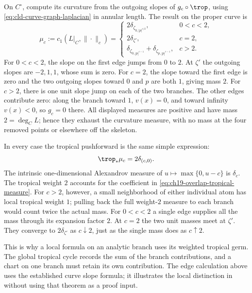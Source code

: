 \begin{example}
On $C^\circ$, compute its curvature from the outgoing slopes of
$g_c\circ\trop$, using \eqref{eq:cld-curve-graph-laplacian} in
annular length.  The result on the proper curve is
\begin{equation}
\label{eq:ch19-overlap-curve-measure}
 \mu_c:=c_1(L|_C,\|\cdot\|_c)=
 \begin{cases}
  2\delta_{\zeta_{0,|p|^{c/2}}},&0<c<2,\\
  2\delta_{\zeta'},&c=2,\\
  \delta_{\zeta_{0,|p|^{c-1}}}
   +\delta_{\zeta_{p,|p|^{c-1}}},&c>2.
 \end{cases}
\end{equation}
For $0<c<2$, the slope on the first edge jumps from $0$ to $2$.
At $\zeta'$ the outgoing slopes are $-2,1,1$, whose sum is zero.
For $c=2$, the slope toward the first edge is zero and the two
outgoing slopes toward $0$ and $p$ are both $1$, giving mass $2$.
For $c>2$, there is one unit slope jump on each of the two branches.
The other edges contribute zero: along the branch toward $1$, $v(x)=0$,
and toward infinity $v(x)<0$, so $g_c=0$ there.  All displayed
measures are positive and have mass $2=\deg_C L$; hence they exhaust
the curvature measure, with no mass at the four removed points or
elsewhere off the skeleton.

In every case the tropical pushforward is the same simple expression:
\begin{equation}
\label{eq:ch19-overlap-tropical-measure}
 \trop_*\mu_c=2\delta_{(c,0)}.
\end{equation}
The intrinsic one-dimensional Alexandrov measure of
$u\mapsto\max\{0,u-c\}$ is $\delta_c$.  The tropical weight $2$
accounts for the coefficient in
\eqref{eq:ch19-overlap-tropical-measure}.  For $c>2$, however, a small
neighborhood of either individual atom has local tropical weight $1$;
pulling back the full weight-$2$ measure to each branch would count
twice the actual mass.  For $0<c<2$ a single edge supplies all the
mass through its expansion factor $2$.  At $c=2$ the two unit masses
meet at $\zeta'$.  They converge to $2\delta_{\zeta'}$ as $c\downarrow2$,
just as the single mass does as $c\uparrow2$.
\end{example}

This is why a local formula on an analytic branch uses its weighted
tropical germ.  The global tropical cycle records the sum of the branch
contributions, and a chart on one branch must retain its own contribution.
The edge calculation above uses the established curve slope formula;
it illustrates the local distinction in
\cite[Theorem~10.2]{Lin26} without using that theorem as a proof input.

